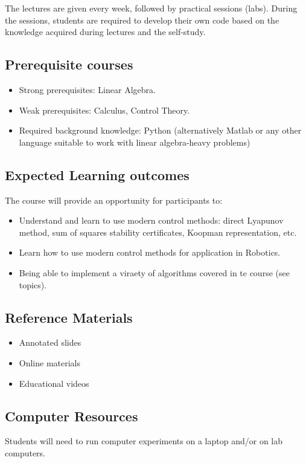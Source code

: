 \documentclass[11pt,a4paper]{article}
\begin{document}
The lectures are given every week, followed by practical sessions (labs). During the sessions, students are required to develop their own code based on the knowledge acquired during lectures and the self-study.

\subsection{Prerequisite courses}

\begin{itemize}
	\item Strong prerequisites: Linear Algebra.
	\item Weak prerequisites: Calculus, Control Theory.
	\item Required background knowledge: Python (alternatively Matlab or any other language suitable to work with linear algebra-heavy problems) 
\end{itemize}

\subsection{Expected Learning outcomes}

The course will provide an opportunity for participants to:
\begin{itemize}
	\item Understand and learn to use modern control methods: direct Lyapunov method, sum of squares stability certificates, Koopman representation, etc.
	\item Learn how to use modern control methods for application in Robotics.
	\item Being able to implement a viraety of algorithms covered in te course (see topics).
\end{itemize}


\subsection{Reference Materials}
\begin{itemize}
	\item Annotated slides
	\item Online materials
	\item Educational videos
\end{itemize}

\subsection{Computer Resources}
Students will need to run computer experiments on a laptop and/or on lab computers. 
\end{document}
